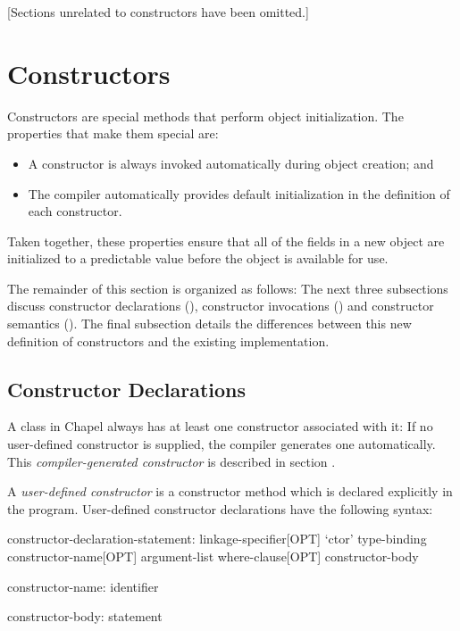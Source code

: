 

\label{Classes}

[Sections unrelated to constructors have been omitted.]

\section{Constructors}
\label{Constructors}

Constructors are special methods that perform object initialization.  
The properties that make them special are:
\begin{itemize}
\item A constructor is always invoked automatically during object creation; and
\item The compiler automatically provides default initialization in the
definition of each constructor.
\end{itemize}
\noindent
Taken together, these properties ensure that all of the fields in a new object are
initialized to a predictable value before the object is available for use.

The remainder of this section is organized as follows: The next three
subsections discuss constructor declarations (),
constructor invocations () and constructor
semantics ().  The final subsection
details the differences between this new definition of constructors and the
existing implementation.

\subsection{Constructor Declarations}
\label{Constructor_Declarations}

A class in Chapel always has at least one constructor associated with it: If no
user-defined constructor is supplied, the compiler generates one automatically.
This \emph{compiler-generated constructor} is described in
section .

A \emph{user-defined constructor} is a constructor method which is declared explicitly
in the program.  User-defined constructor declarations have the following syntax:
\begin{syntax}
constructor-declaration-statement:
  linkage-specifier[OPT] `ctor' type-binding constructor-name[OPT] argument-list 
    where-clause[OPT] constructor-body

constructor-name:
  identifier

constructor-body:
  statement
\end{syntax}

